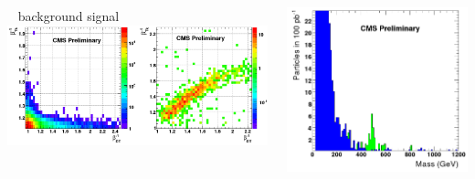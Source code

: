 \documentclass[compress]{beamer}
\begin{document}
\begin{frame}
\vspace{0.15 cm}
\begin{columns}
\scriptsize \mbox{ } \hspace{1 cm} background \hspace{1 cm} \hfill signal \hfill \mbox{ }
\includegraphics[width=\linewidth]{champ_invbeta.png}

\includegraphics[width=\linewidth]{champ_backgrounds.png}


\end{columns}
\label{champs}
\end{frame}
\end{document}
